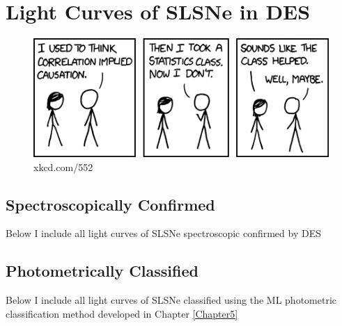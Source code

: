 \chapter{Light Curves of SLSNe in DES}
\label{AppendixA}

\begin{figure}[H]
  \centering
  \includegraphics[width=\textwidth]{Figures/xkcd/appendix.png}
  \caption*{xkcd.com/552}
\end{figure}

\section{Spectroscopically Confirmed}
Below I include all light curves of SLSNe spectroscopic confirmed by DES

\section{Photometrically Classified}
Below I include all light curves of SLSNe classified using the ML photometric classification method developed in Chapter \ref{Chapter5}
